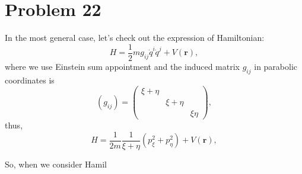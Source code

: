 \section*{Problem 22}

    In the most general case, let's check out the expression of Hamiltonian:
    \begin{equation*}
        H = \frac{1}{2} m g_{ij} \dot{q}^i \dot{q}^j  +  V\left(\boldsymbol{r}\right),
    \end{equation*}
    where we use Einstein sum appointment and the induced matrix $g_{ij}$ in parabolic coordinates is
    \begin{equation}
        \left(g_{ij}\right)  = \left(
        \begin{matrix}
            \xi + \eta  &               &           \\
                        & \xi + \eta    &           \\
                        &               &  \xi\eta
        \end{matrix}
        \right),
    \end{equation}
    thus,
    \begin{equation}
        H = \frac{1}{2m} \frac{1}{\xi+\eta} \left( p_\xi^2 + p_\eta^2 \right)  +  V\left(\boldsymbol{r}\right),
    \end{equation}

    So, when we consider Hamil
